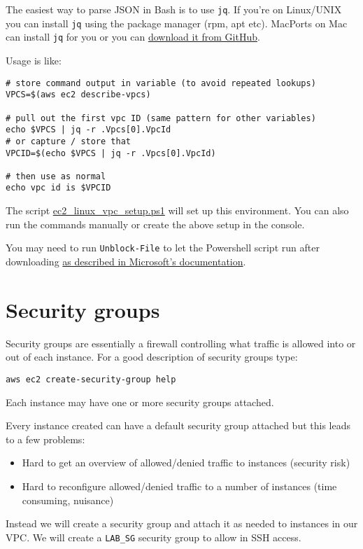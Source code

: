 \documentclass{pgnotes}
\begin{document}
The easiest way to parse JSON in Bash is to use \texttt{jq}.
If you're on Linux/UNIX you can install \texttt{jq} using the package manager (rpm, apt etc).
MacPorts on Mac can install \texttt{jq} for you or you can \href{https://stedolan.github.io/jq/}{download it from GitHub}.

Usage is like:
\begin{verbatim}
# store command output in variable (to avoid repeated lookups)
VPCS=$(aws ec2 describe-vpcs)

# pull out the first vpc ID (same pattern for other variables)
echo $VPCS | jq -r .Vpcs[0].VpcId
# or capture / store that
VPCID=$(echo $VPCS | jq -r .Vpcs[0].VpcId)

# then use as normal
echo vpc id is $VPCID
\end{verbatim}




The script \url{ec2_linux_vpc_setup.ps1} will set up this environment.
You can also run the commands manually or create the above setup in the console. 

You may need to run \texttt{Unblock-File} to let the Powershell script run after downloading \href{https://docs.microsoft.com/en-us/powershell/module/microsoft.powershell.utility/unblock-file?view=powershell-7}{as described in Microsoft's documentation}.

\section{Security groups}

Security groups are essentially a firewall controlling what traffic is allowed into or out of each instance.
For a good description of security groups type:
\begin{verbatim}
aws ec2 create-security-group help
\end{verbatim}

Each instance may have one or more security groups attached.

Every instance created can have a default security group attached but this leads to a few problems:
\begin{itemize}
\item Hard to get an overview of allowed/denied traffic to instances (security risk)
\item Hard to reconfigure allowed/denied traffic to a number of instances (time consuming, nuisance)
\end{itemize}
Instead we will create a security group and attach it as needed to instances in our VPC.
We will create a \texttt{LAB\_SG} security group to allow in SSH access.
\end{document}
